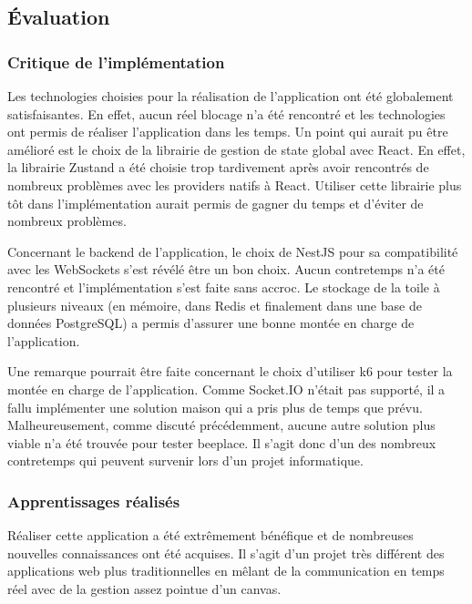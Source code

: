 \subsection{Évaluation}


\subsubsection{Critique de l'implémentation}

Les technologies choisies pour la réalisation de l'application ont été globalement satisfaisantes. En effet, aucun réel blocage n'a été rencontré et les technologies ont permis de réaliser l'application dans les temps. Un point qui aurait pu être amélioré est le choix de la librairie de gestion de state global avec React. En effet, la librairie Zustand a été choisie trop tardivement après avoir rencontrés de nombreux problèmes avec les providers natifs à React. Utiliser cette librairie plus tôt dans l'implémentation aurait permis de gagner du temps et d'éviter de nombreux problèmes.

Concernant le backend de l'application, le choix de NestJS pour sa compatibilité avec les WebSockets s'est révélé être un bon choix. Aucun contretemps n'a été rencontré et l'implémentation s'est faite sans accroc. Le stockage de la toile à plusieurs niveaux (en mémoire, dans Redis et finalement dans une base de données PostgreSQL) a permis d'assurer une bonne montée en charge de l'application.

Une remarque pourrait être faite concernant le choix d'utiliser k6 pour tester la montée en charge de l'application. Comme Socket.IO n'était pas supporté, il a fallu implémenter une solution maison qui a pris plus de temps que prévu. Malheureusement, comme discuté précédemment, aucune autre solution plus viable n'a été trouvée pour tester \gls{beeplace}. Il s'agit donc d'un des nombreux contretemps qui peuvent survenir lors d'un projet informatique.

\subsubsection{Apprentissages réalisés}

Réaliser cette application a été extrêmement bénéfique et de nombreuses nouvelles connaissances ont été acquises. Il s'agit d'un projet très différent des applications web plus traditionnelles en mêlant de la communication en temps réel avec de la gestion assez pointue d'un canvas.

